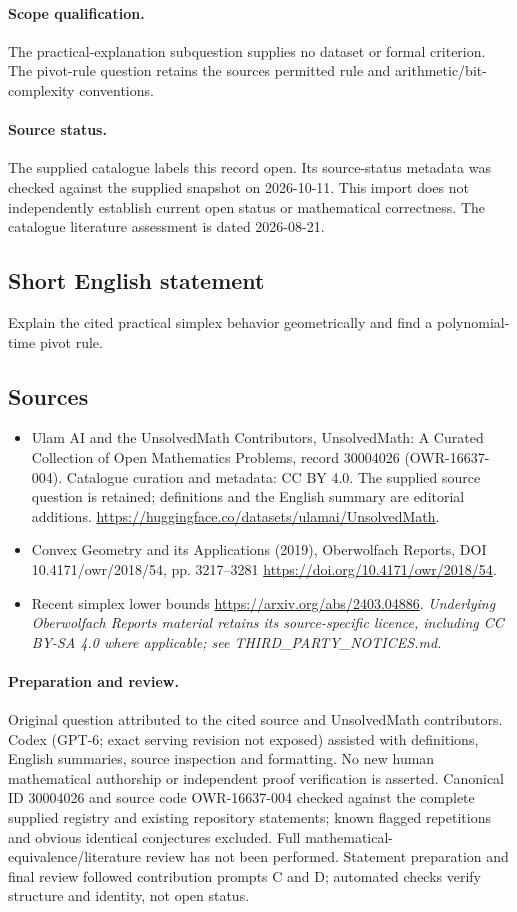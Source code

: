 \documentclass[11pt]{article}
\begin{document}
\paragraph{Scope qualification.}
The practical-explanation subquestion supplies no dataset or formal criterion. The pivot-rule question retains the source\textquotesingle s permitted rule and arithmetic/bit-complexity conventions.
\paragraph{Source status.}
The supplied catalogue labels this record open. Its source-status metadata was checked against the supplied snapshot on 2026-10-11. This import does not independently establish current open status or mathematical correctness. The catalogue literature assessment is dated 2026-08-21.
\subsection{Short English statement}
Explain the cited practical simplex behavior geometrically and find a polynomial-time pivot rule.
\subsection{Sources}
\begin{itemize}
\item[S1] Ulam AI and the UnsolvedMath Contributors, UnsolvedMath: A Curated Collection of Open Mathematics Problems, record 30004026 (OWR-16637-004). Catalogue curation and metadata: CC BY 4.0. The supplied source question is retained; definitions and the English summary are editorial additions.
\url{https://huggingface.co/datasets/ulamai/UnsolvedMath}.
\item[S2] Convex Geometry and its Applications (2019), Oberwolfach Reports, DOI 10.4171/owr/2018/54, pp. 3217--3281
\url{https://doi.org/10.4171/owr/2018/54}.
\item[S3] Recent simplex lower bounds
\url{https://arxiv.org/abs/2403.04886}.
\textit{Underlying Oberwolfach Reports material retains its source-specific licence, including CC BY-SA 4.0 where applicable; see THIRD\_PARTY\_NOTICES.md.}
\end{itemize}
\paragraph{Preparation and review.}
Original question attributed to the cited source and UnsolvedMath contributors. Codex (GPT-6; exact serving revision not exposed) assisted with definitions, English summaries, source inspection and formatting. No new human mathematical authorship or independent proof verification is asserted. Canonical ID 30004026 and source code OWR-16637-004 checked against the complete supplied registry and existing repository statements; known flagged repetitions and obvious identical conjectures excluded. Full mathematical-equivalence/literature review has not been performed. Statement preparation and final review followed contribution prompts C and D; automated checks verify structure and identity, not open status.
\label{end:30004026}
\end{document}
